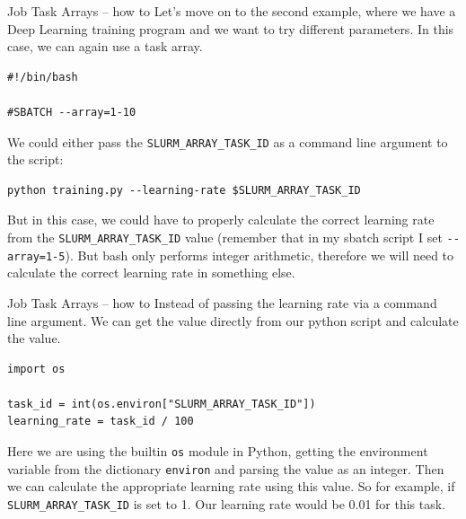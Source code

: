\documentclass[10pt]{beamer}
\begin{document}
\begin{frame}[label={sec:org94e62a1},fragile]{Job Task Arrays -- how to}
 Let's move on to the second example, where we have a Deep Learning training
program and we want to try different parameters. In this case, we can again use
a task array.

\begin{verbatim}
#!/bin/bash

#SBATCH --array=1-10
\end{verbatim}

We could either pass the \texttt{SLURM\_ARRAY\_TASK\_ID} as a command line argument to the
script:

\begin{verbatim}
python training.py --learning-rate $SLURM_ARRAY_TASK_ID
\end{verbatim}

But in this case, we could have to properly calculate the correct learning rate
from the \texttt{SLURM\_ARRAY\_TASK\_ID} value (remember that in my sbatch script I set
\texttt{-{}-array=1-5}). But bash only performs integer arithmetic, therefore we will need
to calculate the correct learning rate in something else.
\end{frame}

\begin{frame}[label={sec:org5c67774},fragile]{Job Task Arrays -- how to}
 Instead of passing the learning rate via a command line argument. We can get the
value directly from our python script and calculate the value.

\begin{verbatim}
import os

task_id = int(os.environ["SLURM_ARRAY_TASK_ID"])
learning_rate = task_id / 100
\end{verbatim}

Here we are using the builtin \texttt{os} module in Python, getting the environment
variable from the dictionary \texttt{environ} and parsing the value as an integer. Then
we can calculate the appropriate learning rate using this value. So for example,
if \texttt{SLURM\_ARRAY\_TASK\_ID} is set to 1. Our learning rate would be 0.01 for this
task.
\end{frame}
\end{document}
